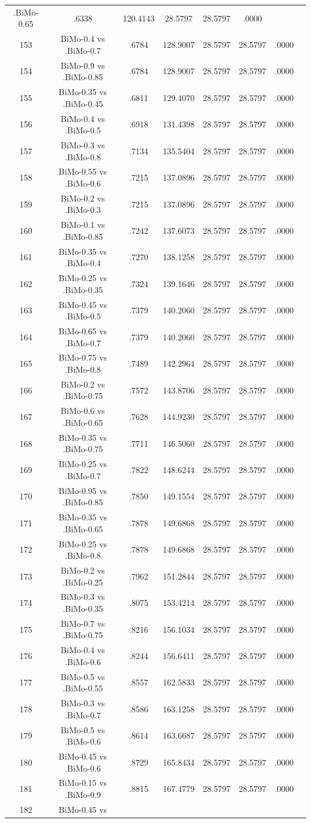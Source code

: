 \documentclass[a4paper,10pt]{article}
\begin{document}
\begin{landscape}
\begin{table}[!htp]
\begin{tabular}{cccccccc}
.BiMo-0.65&.6338&120.4143&28.5797&28.5797&.0000\\153&BiMo-0.4 vs .BiMo-0.7&.6784&128.9007&28.5797&28.5797&.0000\\154&BiMo-0.9 vs .BiMo-0.85&.6784&128.9007&28.5797&28.5797&.0000\\155&BiMo-0.35 vs .BiMo-0.45&.6811&129.4070&28.5797&28.5797&.0000\\156&BiMo-0.4 vs .BiMo-0.5&.6918&131.4398&28.5797&28.5797&.0000\\157&BiMo-0.3 vs .BiMo-0.8&.7134&135.5404&28.5797&28.5797&.0000\\158&BiMo-0.55 vs .BiMo-0.6&.7215&137.0896&28.5797&28.5797&.0000\\159&BiMo-0.2 vs .BiMo-0.3&.7215&137.0896&28.5797&28.5797&.0000\\160&BiMo-0.1 vs .BiMo-0.85&.7242&137.6073&28.5797&28.5797&.0000\\161&BiMo-0.35 vs .BiMo-0.4&.7270&138.1258&28.5797&28.5797&.0000\\162&BiMo-0.25 vs .BiMo-0.35&.7324&139.1646&28.5797&28.5797&.0000\\163&BiMo-0.45 vs .BiMo-0.5&.7379&140.2060&28.5797&28.5797&.0000\\164&BiMo-0.65 vs .BiMo-0.7&.7379&140.2060&28.5797&28.5797&.0000\\165&BiMo-0.75 vs .BiMo-0.8&.7489&142.2964&28.5797&28.5797&.0000\\166&BiMo-0.2 vs .BiMo-0.75&.7572&143.8706&28.5797&28.5797&.0000\\167&BiMo-0.6 vs .BiMo-0.65&.7628&144.9230&28.5797&28.5797&.0000\\168&BiMo-0.35 vs .BiMo-0.75&.7711&146.5060&28.5797&28.5797&.0000\\169&BiMo-0.25 vs .BiMo-0.7&.7822&148.6244&28.5797&28.5797&.0000\\170&BiMo-0.95 vs .BiMo-0.85&.7850&149.1554&28.5797&28.5797&.0000\\171&BiMo-0.35 vs .BiMo-0.65&.7878&149.6868&28.5797&28.5797&.0000\\172&BiMo-0.25 vs .BiMo-0.8&.7878&149.6868&28.5797&28.5797&.0000\\173&BiMo-0.2 vs .BiMo-0.25&.7962&151.2844&28.5797&28.5797&.0000\\174&BiMo-0.3 vs .BiMo-0.35&.8075&153.4214&28.5797&28.5797&.0000\\175&BiMo-0.7 vs .BiMo-0.75&.8216&156.1034&28.5797&28.5797&.0000\\176&BiMo-0.4 vs .BiMo-0.6&.8244&156.6411&28.5797&28.5797&.0000\\177&BiMo-0.5 vs .BiMo-0.55&.8557&162.5833&28.5797&28.5797&.0000\\178&BiMo-0.3 vs .BiMo-0.7&.8586&163.1258&28.5797&28.5797&.0000\\179&BiMo-0.5 vs .BiMo-0.6&.8614&163.6687&28.5797&28.5797&.0000\\180&BiMo-0.45 vs .BiMo-0.6&.8729&165.8434&28.5797&28.5797&.0000\\181&BiMo-0.15 vs .BiMo-0.9&.8815&167.4779&28.5797&28.5797&.0000\\182&BiMo-0.45 vs 
\end{tabular}
\end{table}
\end{landscape}
\end{document}
